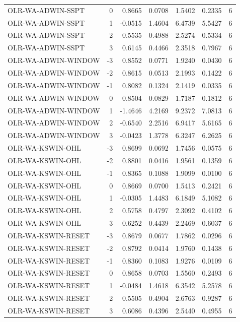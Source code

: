 \begin{tabular}{lrrrrrr}
OLR-WA-ADWIN-SSPT & 0 & 0.8665 & 0.0708 & 1.5402 & 0.2335 & 6 \\
OLR-WA-ADWIN-SSPT & 1 & -0.0515 & 1.4604 & 6.4739 & 5.5427 & 6 \\
OLR-WA-ADWIN-SSPT & 2 & 0.5535 & 0.4988 & 2.5274 & 0.5334 & 6 \\
OLR-WA-ADWIN-SSPT & 3 & 0.6145 & 0.4466 & 2.3518 & 0.7967 & 6 \\
OLR-WA-ADWIN-WINDOW & -3 & 0.8552 & 0.0771 & 1.9240 & 0.0430 & 6 \\
OLR-WA-ADWIN-WINDOW & -2 & 0.8615 & 0.0513 & 2.1993 & 0.1422 & 6 \\
OLR-WA-ADWIN-WINDOW & -1 & 0.8082 & 0.1324 & 2.1419 & 0.0335 & 6 \\
OLR-WA-ADWIN-WINDOW & 0 & 0.8504 & 0.0829 & 1.7187 & 0.1812 & 6 \\
OLR-WA-ADWIN-WINDOW & 1 & -1.4646 & 4.2169 & 9.2372 & 7.0813 & 6 \\
OLR-WA-ADWIN-WINDOW & 2 & -0.6540 & 2.2516 & 6.9417 & 5.6165 & 6 \\
OLR-WA-ADWIN-WINDOW & 3 & -0.0423 & 1.3778 & 6.3247 & 6.2625 & 6 \\
OLR-WA-KSWIN-OHL & -3 & 0.8699 & 0.0692 & 1.7456 & 0.0575 & 6 \\
OLR-WA-KSWIN-OHL & -2 & 0.8801 & 0.0416 & 1.9561 & 0.1359 & 6 \\
OLR-WA-KSWIN-OHL & -1 & 0.8365 & 0.1088 & 1.9099 & 0.0100 & 6 \\
OLR-WA-KSWIN-OHL & 0 & 0.8669 & 0.0700 & 1.5413 & 0.2421 & 6 \\
OLR-WA-KSWIN-OHL & 1 & -0.0305 & 1.4483 & 6.1849 & 5.1082 & 6 \\
OLR-WA-KSWIN-OHL & 2 & 0.5758 & 0.4797 & 2.3092 & 0.4102 & 6 \\
OLR-WA-KSWIN-OHL & 3 & 0.6252 & 0.4439 & 2.2469 & 0.6037 & 6 \\
OLR-WA-KSWIN-RESET & -3 & 0.8679 & 0.0677 & 1.7862 & 0.0296 & 6 \\
OLR-WA-KSWIN-RESET & -2 & 0.8792 & 0.0414 & 1.9760 & 0.1438 & 6 \\
OLR-WA-KSWIN-RESET & -1 & 0.8360 & 0.1083 & 1.9276 & 0.0109 & 6 \\
OLR-WA-KSWIN-RESET & 0 & 0.8658 & 0.0703 & 1.5560 & 0.2493 & 6 \\
OLR-WA-KSWIN-RESET & 1 & -0.0484 & 1.4618 & 6.3542 & 5.2578 & 6 \\
OLR-WA-KSWIN-RESET & 2 & 0.5505 & 0.4904 & 2.6763 & 0.9287 & 6 \\
OLR-WA-KSWIN-RESET & 3 & 0.6086 & 0.4396 & 2.5440 & 0.4955 & 6 \\

\end{tabular}
